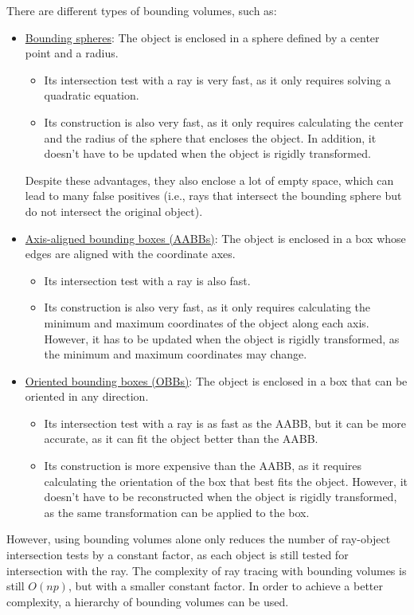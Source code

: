 There are different types of bounding volumes, such as:
\begin{itemize}
    \item \ul{Bounding spheres}: The object is enclosed in a sphere defined by a center point and a radius.
    \begin{itemize}
        \item Its intersection test with a ray is very fast, as it only requires solving a quadratic equation.
        \item Its construction is also very fast, as it only requires calculating the center and the radius of the sphere that encloses the object. In addition, it doesn't have to be updated when the object is rigidly transformed.
    \end{itemize}
    Despite these advantages, they also enclose a lot of empty space, which can lead to many false positives (i.e., rays that intersect the bounding sphere but do not intersect the original object).
    \item \ul{Axis-aligned bounding boxes (AABBs)}: The object is enclosed in a box whose edges are aligned with the coordinate axes.
    \begin{itemize}
        \item Its intersection test with a ray is also fast.
        \item Its construction is also very fast, as it only requires calculating the minimum and maximum coordinates of the object along each axis. However, it has to be updated when the object is rigidly transformed, as the minimum and maximum coordinates may change.
    \end{itemize}
    \item \ul{Oriented bounding boxes (OBBs)}: The object is enclosed in a box that can be oriented in any direction.
    \begin{itemize}
        \item Its intersection test with a ray is as fast as the AABB, but it can be more accurate, as it can fit the object better than the AABB.
        \item Its construction is more expensive than the AABB, as it requires calculating the orientation of the box that best fits the object. However, it doesn't have to be reconstructed when the object is rigidly transformed, as the same transformation can be applied to the box.
    \end{itemize}
\end{itemize}

However, using bounding volumes alone only reduces the number of ray-object intersection tests by a constant factor, as each object is still tested for intersection with the ray. The complexity of ray tracing with bounding volumes is still $O(np)$, but with a smaller constant factor. In order to achieve a better complexity, a hierarchy of bounding volumes can be used.

